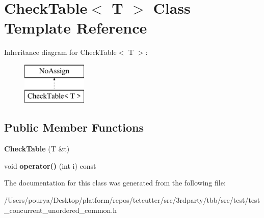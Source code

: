 \hypertarget{classCheckTable}{}\section{Check\+Table$<$ T $>$ Class Template Reference}
\label{classCheckTable}
Inheritance diagram for Check\+Table$<$ T $>$\+:\begin{figure}[H]
\begin{center}
\leavevmode
\includegraphics[height=2.000000cm]{classCheckTable}
\end{center}
\end{figure}
\subsection*{Public Member Functions}
\begin{DoxyCompactItemize}
\item 
\hypertarget{classCheckTable_ad0393e0a96de532cecb863e93b007b42}{}{\bfseries Check\+Table} (T \&t)\label{classCheckTable_ad0393e0a96de532cecb863e93b007b42}

\item 
\hypertarget{classCheckTable_a15bdcd06d956d397b12112218db534be}{}void {\bfseries operator()} (int i) const \label{classCheckTable_a15bdcd06d956d397b12112218db534be}

\end{DoxyCompactItemize}


The documentation for this class was generated from the following file\+:\begin{DoxyCompactItemize}
\item 
/\+Users/pourya/\+Desktop/platform/repos/tetcutter/src/3rdparty/tbb/src/test/test\+\_\+concurrent\+\_\+unordered\+\_\+common.\+h\end{DoxyCompactItemize}
